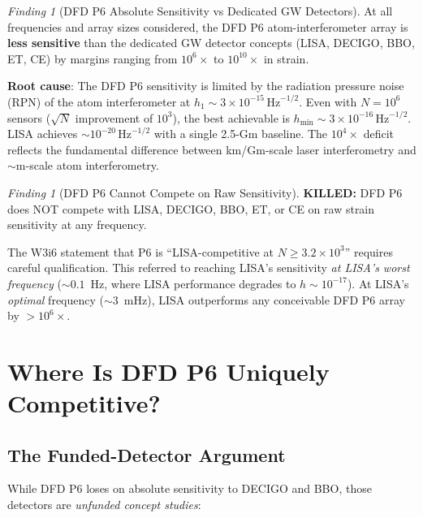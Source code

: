 \documentclass[11pt]{article}
\theoremstyle{definition}
\theoremstyle{remark}
\newtheorem{finding}[theorem]{Finding}
\newcommand{\ee}[1]{\times10^{#1}}
\newcommand{\sqrtHz}{\,\mathrm{Hz}^{-1/2}}
\newcommand{\killed}[1]{\textcolor{red!70!black}{\textbf{KILLED:} #1}}
\begin{document}
\begin{finding}[DFD P6 Absolute Sensitivity vs Dedicated GW Detectors]
\label{find:P6-absolute}
At all frequencies and array sizes considered, the DFD P6 atom-interferometer
array is \textbf{less sensitive} than the dedicated GW detector concepts
(LISA, DECIGO, BBO, ET, CE) by margins ranging from $10^{6}\times$ to
$10^{10}\times$ in strain.

\textbf{Root cause}: The DFD P6 sensitivity is limited by the radiation
pressure noise (RPN) of the atom interferometer at
$h_1 \sim 3\ee{-15}\sqrtHz$. Even with $N = 10^6$ sensors ($\sqrt{N}$
improvement of $10^3$), the best achievable is $h_{\min} \sim 3\ee{-16}\sqrtHz$.
LISA achieves $\sim 10^{-20}\sqrtHz$ with a single 2.5-Gm baseline. The
$10^4\times$ deficit reflects the fundamental difference between
km/Gm-scale laser interferometry and $\sim$m-scale atom interferometry.
\end{finding}

\begin{finding}[DFD P6 Cannot Compete on Raw Sensitivity]
\label{find:P6-nocompete}
\killed{DFD P6 does NOT compete with LISA, DECIGO, BBO, ET, or CE on
raw strain sensitivity at any frequency.}

The W3i6 statement that P6 is ``LISA-competitive at $N \geq 3.2\ee{3}$''
requires careful qualification. This referred to reaching LISA's sensitivity
\emph{at LISA's worst frequency} ($\sim 0.1$~Hz, where LISA performance
degrades to $h \sim 10^{-17}$). At LISA's \emph{optimal} frequency
($\sim 3$~mHz), LISA outperforms any conceivable DFD P6 array by $> 10^6\times$.
\end{finding}

\section{Where Is DFD P6 Uniquely Competitive?}
\label{sec:P6-unique}

\subsection{The Funded-Detector Argument}

While DFD P6 loses on absolute sensitivity to DECIGO and BBO, those
detectors are \emph{unfunded concept studies}:
\end{document}
